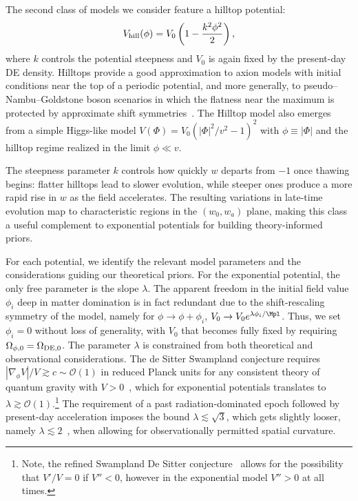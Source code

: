 The second class of models we consider feature a hilltop potential:
\begin{equation}
    V_{\rm hill}(\phi)=V_0\left(1-\frac{k^2\phi^2}{2}\right)\label{eq:ch11-hilltop},
\end{equation}
where $k$ controls the potential steepness and $V_0$ is again fixed by the present-day DE density. Hilltops provide a good approximation to axion models with initial conditions near the top of a periodic potential, and more generally, to pseudo--Nambu--Goldstone boson scenarios in which the flatness near the maximum is protected by approximate shift symmetries~\cite{Dutta:2008qn,Frieman:1995pm}. The Hilltop model also emerges from a simple Higgs-like model $V(\Phi)= V_0 ( |\Phi|^2/v^2 -1)^2$ with $\phi \equiv |\Phi|$ and the hilltop regime realized in the limit $\phi \ll v$.

The steepness parameter $k$ controls how quickly $w$ departs from $-1$ once thawing begins: flatter hilltops lead to slower evolution, while steeper ones produce a more rapid rise in $w$ as the field accelerates.  The resulting variations in late-time evolution map to characteristic regions in the $(w_0,w_a)$ plane, making this class a useful complement to exponential potentials for building theory-informed priors.

For each potential, we identify the relevant model parameters and the considerations guiding our theoretical priors. For the exponential potential, the only free parameter is the slope $\lambda$. The apparent freedom in the initial field value $\phi_i$ deep in matter domination is in fact redundant due to the shift-rescaling symmetry of the model, namely for $\phi\rightarrow \phi+\phi_i$, $V_0\rightarrow V_0e^{\lambda \phi_i/\Mpl}$. Thus, we set $\phi_i=0$ without loss of generality, with $V_0$ that becomes fully fixed by requiring $\Omega_{\phi,0}=\Omega_{\rm DE,0}$. The parameter $\lambda$ is constrained from both theoretical and observational considerations. The de Sitter Swampland conjecture requires $|\nabla_\phi V|/V \gtrsim c \sim \mathcal{O}(1)$ in reduced Planck units for any consistent theory of quantum gravity with $V > 0$~\cite{Obied:2018sgi}, which for exponential potentials translates to $\lambda \gtrsim \mathcal{O}(1)$.\footnote{Note, the refined Swampland De Sitter conjecture~\cite{Agrawal:2018rcg} allows for the possibility that $V'/V=0$ if $V''<0$, however in the exponential model $V''>0$ at all times.} The requirement of a past radiation-dominated epoch followed by present-day acceleration imposes the bound $\lambda \lesssim \sqrt{3}$, which gets slightly looser, namely $\lambda \lesssim 2$~\cite{Andriot:2024jsh},  when allowing for observationally permitted spatial curvature.

